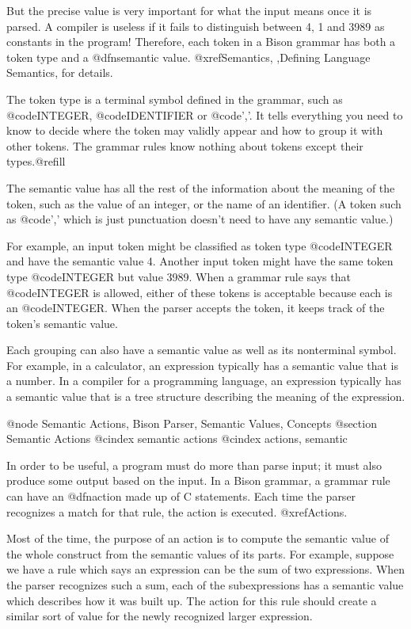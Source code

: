 But the precise value is very important for what the input means once it is
parsed.  A compiler is useless if it fails to distinguish between 4, 1 and
3989 as constants in the program!  Therefore, each token in a Bison grammar
has both a token type and a @dfn{semantic value}.  @xref{Semantics, ,Defining Language Semantics},
for details.

The token type is a terminal symbol defined in the grammar, such as
@code{INTEGER}, @code{IDENTIFIER} or @code{','}.  It tells everything
you need to know to decide where the token may validly appear and how to
group it with other tokens.  The grammar rules know nothing about tokens
except their types.@refill

The semantic value has all the rest of the information about the
meaning of the token, such as the value of an integer, or the name of an
identifier.  (A token such as @code{','} which is just punctuation doesn't
need to have any semantic value.)

For example, an input token might be classified as token type
@code{INTEGER} and have the semantic value 4.  Another input token might
have the same token type @code{INTEGER} but value 3989.  When a grammar
rule says that @code{INTEGER} is allowed, either of these tokens is
acceptable because each is an @code{INTEGER}.  When the parser accepts the
token, it keeps track of the token's semantic value.

Each grouping can also have a semantic value as well as its nonterminal
symbol.  For example, in a calculator, an expression typically has a
semantic value that is a number.  In a compiler for a programming
language, an expression typically has a semantic value that is a tree
structure describing the meaning of the expression.

@node Semantic Actions, Bison Parser, Semantic Values, Concepts
@section Semantic Actions
@cindex semantic actions
@cindex actions, semantic

In order to be useful, a program must do more than parse input; it must
also produce some output based on the input.  In a Bison grammar, a grammar
rule can have an @dfn{action} made up of C statements.  Each time the
parser recognizes a match for that rule, the action is executed.
@xref{Actions}.
        
Most of the time, the purpose of an action is to compute the semantic value
of the whole construct from the semantic values of its parts.  For example,
suppose we have a rule which says an expression can be the sum of two
expressions.  When the parser recognizes such a sum, each of the
subexpressions has a semantic value which describes how it was built up.
The action for this rule should create a similar sort of value for the
newly recognized larger expression.

